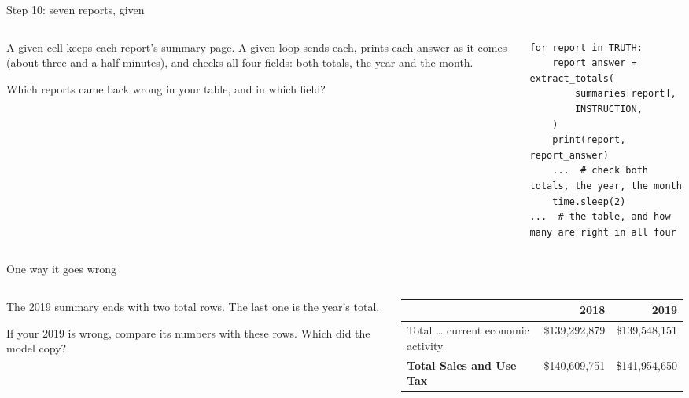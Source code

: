 \documentclass[9pt,aspectratio=169]{beamer}
\begin{document}
\begin{frame}[fragile]{Step 10: seven reports, given}
    \begin{columns}[T]
        \begin{column}{0.37\textwidth}
            A given cell keeps each report's summary page. A given loop sends each, prints each answer as it comes (about three and a half minutes), and checks all four fields: both totals, the year and the month.

            \medskip
            Which reports came back wrong in your table, and in which field?
        \end{column}
        \begin{column}{0.6\textwidth}
\begin{lstlisting}
for report in TRUTH:
    report_answer = extract_totals(
        summaries[report],
        INSTRUCTION,
    )
    print(report, report_answer)
    ...  # check both totals, the year, the month
    time.sleep(2)
...  # the table, and how many are right in all four
\end{lstlisting}
        \end{column}
    \end{columns}
\end{frame}

\begin{frame}{One way it goes wrong}
    \begin{columns}[T]
        \begin{column}{0.37\textwidth}
            The 2019 summary ends with two total rows. The last one is the year's total.

            \medskip
            If your 2019 is wrong, compare its numbers with these rows. Which did the model copy?
        \end{column}
        \begin{column}{0.6\textwidth}
            {\footnotesize
            \begin{tabular}{@{}lrr@{}}
                \toprule
                & \textbf{2018} & \textbf{2019} \\
                \midrule
                Total \ldots{} current economic activity & \$139,292,879 & \$139,548,151 \\
                \textbf{Total Sales and Use Tax} & \$140,609,751 & \$141,954,650 \\
                \bottomrule
            \end{tabular}\par}
        \end{column}
    \end{columns}
\end{frame}
\end{document}
